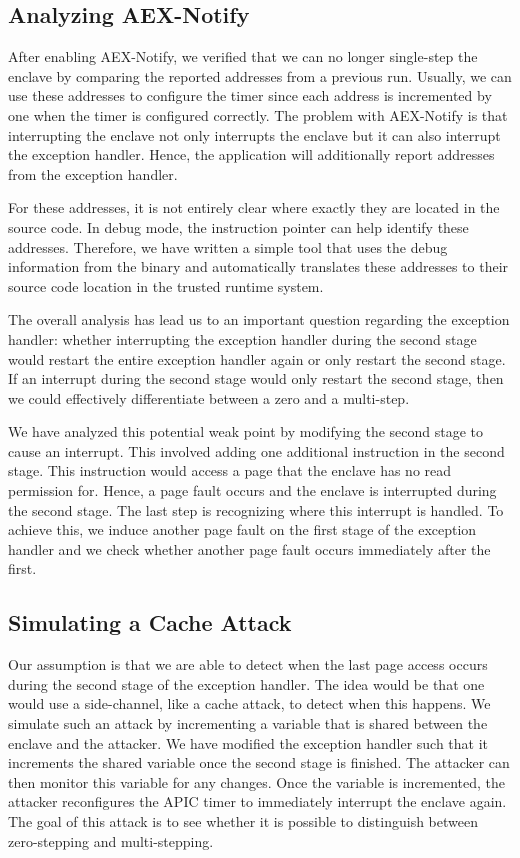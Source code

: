 \documentclass{llncs}
\begin{document}
\subsection{Analyzing AEX-Notify}

After enabling AEX-Notify, we verified that we can no longer single-step the
enclave by comparing the reported addresses from a previous run.
Usually, we can use these addresses to configure the timer since each address
is incremented by one when the timer is configured correctly.
The problem with AEX-Notify is that interrupting the enclave not only
interrupts the enclave but it can also interrupt the exception handler.
Hence, the application will additionally report addresses from the exception
handler.

For these addresses, it is not entirely clear where exactly they are located in
the source code.
In debug mode, the instruction pointer can help identify these addresses.
Therefore, we have written a simple tool that uses the debug information from
the binary and automatically translates these addresses to their source code
location in the trusted runtime system.

The overall analysis has lead us to an important question regarding the
exception handler:
whether interrupting the exception handler during the second stage would
restart the entire exception handler again or only restart the second stage.
If an interrupt during the second stage would only restart the second stage,
then we could effectively differentiate between a zero and a multi-step.

We have analyzed this potential weak point by modifying the second stage to
cause an interrupt.
This involved adding one additional instruction in the second stage.
This instruction would access a page that the enclave has no read permission for.
Hence, a page fault occurs and the enclave is interrupted during the second stage.
The last step is recognizing where this interrupt is handled.
To achieve this, we induce another page fault on the first stage of the exception handler
and we check whether another page fault occurs immediately after the first.

\subsection{Simulating a Cache Attack}

Our assumption is that we are able to detect when the last page access occurs
during the second stage of the exception handler.
The idea would be that one would use a side-channel, like a cache attack, to
detect when this happens.
We simulate such an attack by incrementing a variable that is shared between
the enclave and the attacker.
We have modified the exception handler such that it increments the shared
variable once the second stage is finished.
The attacker can then monitor this variable for any changes.
Once the variable is incremented, the attacker reconfigures the APIC timer to
immediately interrupt the enclave again.
The goal of this attack is to see whether it is possible to distinguish between
zero-stepping and multi-stepping.
\end{document}
